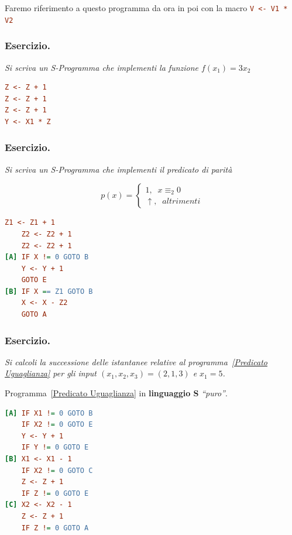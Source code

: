 Faremo riferimento a questo programma da ora in poi con la macro \lstinline[language=ini]{V <- V1 * V2}

\subsubsection*{Esercizio.} \textit{Si scriva un S-Programma che implementi la funzione \(f(x_1)=3x_2\)}

\begin{lstlisting}[language=ini, label={Funzione Prodotto con Costante},  caption=Funzione prodotto con costante]
Z <- Z + 1
Z <- Z + 1
Z <- Z + 1
Y <- X1 * Z
\end{lstlisting}

\subsubsection*{Esercizio.} \textit{Si scriva un S-Programma che implementi il predicato di parità}

\begin{equation}
  p(x)= \begin{cases}
        1, \;\; x\equiv_{2}0\\
        \uparrow, \;\; altrimenti
        \end{cases}
\end{equation}

\begin{lstlisting}[language=ini, label={Predicato Pari Dispari},  caption=Predicato di Parità]
    Z1 <- Z1 + 1
    Z2 <- Z2 + 1
    Z2 <- Z2 + 1
[A] IF X != 0 GOTO B
    Y <- Y + 1
    GOTO E
[B] IF X == Z1 GOTO B
    X <- X - Z2
    GOTO A
\end{lstlisting}

\subsubsection*{Esercizio.} \textit{Si calcoli la successione delle istantanee relative al programma~\ref{Predicato Uguaglianza} per gli input \((x_1,x_2,x_3)=(2,1,3)\) e \(x_1=5\).}

Programma~\ref{Predicato Uguaglianza} in \textbf{linguaggio S} \textit{``puro''}.

\begin{lstlisting}[language=ini, caption=Predicato di Uguaglianza senza Macro, label={Predicato Uguaglianza noMacro}]
[A] IF X1 != 0 GOTO B
    IF X2 != 0 GOTO E
    Y <- Y + 1
    IF Y != 0 GOTO E
[B] X1 <- X1 - 1
    IF X2 != 0 GOTO C
    Z <- Z + 1
    IF Z != 0 GOTO E
[C] X2 <- X2 - 1
    Z <- Z + 1
    IF Z != 0 GOTO A
\end{lstlisting}

